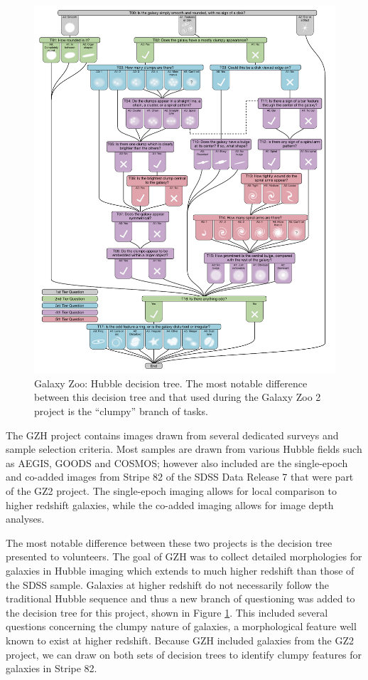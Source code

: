 

\begin{figure}
\includegraphics[width=\textwidth]{Figures/gz3_tree_resized.pdf}
\caption[Galaxy Zoo: Hubble decision tree.]{Galaxy Zoo: Hubble decision tree. The most notable difference between this decision tree and that used during the Galaxy Zoo 2 project is the ``clumpy'' branch of tasks.}
\label{fig: gzh decision tree}
\end{figure}

The GZH project contains images drawn from several dedicated surveys and sample selection criteria. Most samples are drawn from various Hubble fields such as AEGIS, GOODS and COSMOS; however also included are the single-epoch and co-added images from Stripe 82 of the SDSS Data Release 7 that were part of the GZ2 project. The single-epoch imaging allows for local comparison to higher redshift galaxies, while the co-added imaging allows for image depth analyses. 

The most notable difference between these two projects is the decision tree presented to volunteers. The goal of GZH was to collect detailed morphologies for galaxies in Hubble imaging which extends to much higher redshift than those of the SDSS sample. Galaxies at higher redshift do not necessarily follow the traditional Hubble sequence and thus a new branch of questioning was added to the decision tree for this project, shown in Figure \ref{fig: gzh decision tree}. This included several questions concerning the clumpy nature of galaxies, a morphological feature well known to exist at higher redshift. Because GZH included galaxies from the GZ2 project, we can draw on both sets of decision trees to identify clumpy features for galaxies in Stripe 82.


